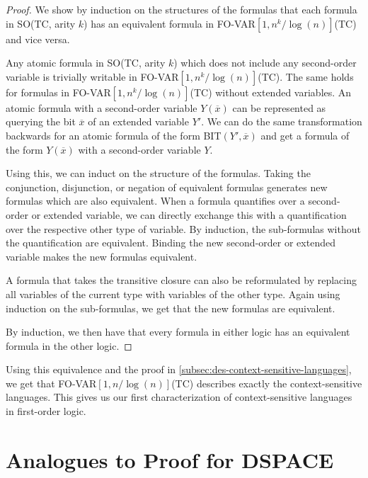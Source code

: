 \begin{proof}
    We show by induction on the structures of the formulas that each formula in \acs{SO}(\acs{TC}, arity $k$) has an equivalent formula in \acs{FO-VAR}$[1, n^k/\log(n)]$(\acs{TC}) and vice versa.

    Any atomic formula in \acs{SO}(\acs{TC}, arity $k$) which does not include any second-order variable is trivially writable in \acs{FO-VAR}$[1, n^k/\log(n)]$(\acs{TC}).
    The same holds for formulas in \acs{FO-VAR}$[1, n^k/\log(n)]$(\acs{TC}) without extended variables.
    An atomic formula with a second-order variable $Y(\overline{x})$ can be represented as querying the bit $\overline{x}$ of an extended variable $Y'$.
    We can do the same transformation backwards for an atomic formula of the form \acs{BIT}$(Y', \overline{x})$ and get a formula of the form $Y(\overline{x})$ with a second-order variable $Y$.

    Using this, we can induct on the structure of the formulas.
    Taking the conjunction, disjunction, or negation of equivalent formulas generates new formulas which are also equivalent.
    When a formula quantifies over a second-order or extended variable, we can directly exchange this with a quantification over the respective other type of variable.
    By induction, the sub-formulas without the quantification are equivalent.
    Binding the new second-order or extended variable makes the new formulas equivalent.

    A formula that takes the transitive closure can also be reformulated by replacing all variables of the current type with variables of the other type.
    Again using induction on the sub-formulas, we get that the new formulas are equivalent.

    By induction, we then have that every formula in either logic has an equivalent formula in the other logic.
\end{proof}

Using this equivalence and the proof in \cref{subsec:des-context-sensitive-languages}, we get that \acs{FO-VAR}$[1, n/\log(n)]$(\acs{TC}) describes exactly the context-sensitive languages.
This gives us our first characterization of context-sensitive languages in first-order logic.


\section{Analogues to Proof for \acs{DSPACE}}\label{sec:analogues-to-proof-for-dspace}

